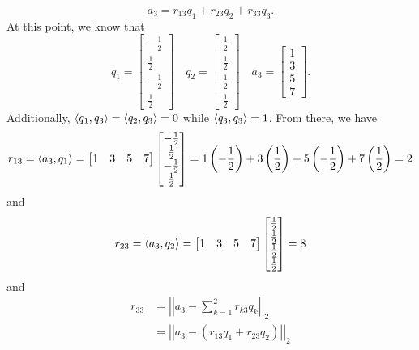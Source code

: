 \documentclass[letterpaper]{article}
\begin{document}
\begin{mdframed}
    \begin{mdframed}
        \[a_3 = r_{13} q_1 + r_{23}q_2 + r_{33}q_3.\]
        At this point, we know that 
        \[q_1 = \begin{bmatrix}
            -\frac{1}{2} \\ \frac{1}{2} \\ -\frac{1}{2} \\ \frac{1}{2}
        \end{bmatrix} \quad q_2 = \begin{bmatrix}
            \frac{1}{2} \\ \frac{1}{2} \\ \frac{1}{2} \\ \frac{1}{2}
        \end{bmatrix} \quad a_3 = \begin{bmatrix}
            1 \\ 3 \\ 5 \\ 7
        \end{bmatrix}.\]
        Additionally, $\langle q_1, q_3 \rangle = \langle q_2, q_3 \rangle = 0$ while $\langle q_3, q_3 \rangle = 1$. From there, we have
        \[r_{13} = \langle a_3, q_1 \rangle = \begin{bmatrix}
            1 & 3 & 5 & 7
        \end{bmatrix} \begin{bmatrix}
            -\frac{1}{2} \\ \frac{1}{2} \\ -\frac{1}{2} \\ \frac{1}{2}
        \end{bmatrix} = 1\left(-\frac{1}{2}\right) + 3\left(\frac{1}{2}\right) + 5\left(-\frac{1}{2}\right) + 7\left(\frac{1}{2}\right) = 2\]
        and 
        \[r_{23} = \langle a_3, q_2 \rangle = \begin{bmatrix}
            1 & 3 & 5 & 7
        \end{bmatrix} \begin{bmatrix}
            \frac{1}{2} \\ \frac{1}{2} \\ \frac{1}{2} \\ \frac{1}{2}
        \end{bmatrix} = 8\]
        and 
        \begin{equation*}
            \begin{aligned}
                r_{33} &= \left|\left| a_3 - \sum_{k = 1}^{2} r_{k3} q_k \right|\right|_2 \\ 
                    &= \left|\left| a_3 - (r_{13} q_1 + r_{23} q_2) \right|\right|_2 \\ 

\end{aligned}
\end{equation*}
\end{mdframed}
\end{mdframed}
\end{document}
